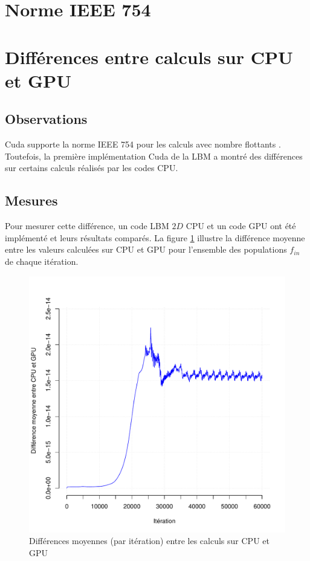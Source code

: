\section{Norme IEEE 754}

\section{Différences entre calculs sur CPU et GPU}
\subsection{Observations}
Cuda supporte la norme IEEE 754 pour les calculs avec nombre flottants \cite{Cuda_IEEE754}. Toutefois, la première implémentation Cuda de la \acs{LBM} a montré des différences sur certains calculs réalisés par les codes \ac{CPU}.

\subsection{Mesures}
Pour mesurer cette différence, un code \ac{LBM} $2D$ \ac{CPU} et un code \ac{GPU} ont été implémenté et leurs résultats comparés. La figure \ref{fig:lbm_float_deltas} illustre la différence moyenne entre les valeurs calculées sur \ac{CPU} et \ac{GPU} pour l'ensemble des populations $f_{in}$ de chaque itération.

\begin{figure}[h]
	\centering
	\includegraphics[scale=0.75, fbox]{../data/lbm_cpu_vs_gpu/deltas/Rplots.pdf}
	\caption{Différences moyennes (par itération) entre les calculs sur \acs{CPU} et \acs{GPU}}
	\label{fig:lbm_float_deltas}
\end{figure}

